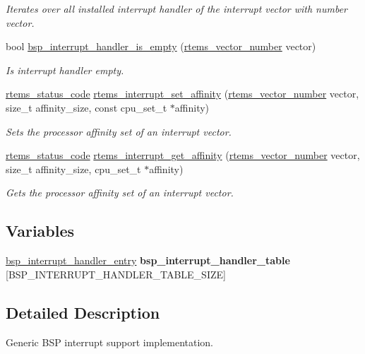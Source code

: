 \begin{DoxyCompactItemize}
\begin{DoxyCompactList}\small\item\em Iterates over all installed interrupt handler of the interrupt vector with number {\itshape vector}. \end{DoxyCompactList}\item 
bool \mbox{\hyperlink{group__bsp__interrupt_ga0ab406af223fad2abc336b84597c7008}{bsp\+\_\+interrupt\+\_\+handler\+\_\+is\+\_\+empty}} (\mbox{\hyperlink{group__ClassicINTR_ga3e434c197d99f128e78cae4d9358bd8b}{rtems\+\_\+vector\+\_\+number}} vector)
\begin{DoxyCompactList}\small\item\em Is interrupt handler empty. \end{DoxyCompactList}\item 
\mbox{\hyperlink{group__ClassicStatus_ga545d41846817eaba6143d52ee4d9e9fe}{rtems\+\_\+status\+\_\+code}} \mbox{\hyperlink{group__rtems__interrupt__extension_ga29b0adc04eff6ae74fd02076a7f2eee6}{rtems\+\_\+interrupt\+\_\+set\+\_\+affinity}} (\mbox{\hyperlink{group__ClassicINTR_ga3e434c197d99f128e78cae4d9358bd8b}{rtems\+\_\+vector\+\_\+number}} vector, size\+\_\+t affinity\+\_\+size, const cpu\+\_\+set\+\_\+t $\ast$affinity)
\begin{DoxyCompactList}\small\item\em Sets the processor affinity set of an interrupt vector. \end{DoxyCompactList}\item 
\mbox{\hyperlink{group__ClassicStatus_ga545d41846817eaba6143d52ee4d9e9fe}{rtems\+\_\+status\+\_\+code}} \mbox{\hyperlink{group__rtems__interrupt__extension_gaf99a316611a290b2e58d9caf48594838}{rtems\+\_\+interrupt\+\_\+get\+\_\+affinity}} (\mbox{\hyperlink{group__ClassicINTR_ga3e434c197d99f128e78cae4d9358bd8b}{rtems\+\_\+vector\+\_\+number}} vector, size\+\_\+t affinity\+\_\+size, cpu\+\_\+set\+\_\+t $\ast$affinity)
\begin{DoxyCompactList}\small\item\em Gets the processor affinity set of an interrupt vector. \end{DoxyCompactList}\end{DoxyCompactItemize}
\subsection*{Variables}
\begin{DoxyCompactItemize}
\item 
\mbox{\label{irq-generic_8c_a5324bbc8bbf933da5137932e052bc2b1}} 
\mbox{\hyperlink{structbsp__interrupt__handler__entry}{bsp\+\_\+interrupt\+\_\+handler\+\_\+entry}} {\bfseries bsp\+\_\+interrupt\+\_\+handler\+\_\+table} \mbox{[}B\+S\+P\+\_\+\+I\+N\+T\+E\+R\+R\+U\+P\+T\+\_\+\+H\+A\+N\+D\+L\+E\+R\+\_\+\+T\+A\+B\+L\+E\+\_\+\+S\+I\+ZE\mbox{]}
\end{DoxyCompactItemize}


\subsection{Detailed Description}
Generic B\+SP interrupt support implementation. 

